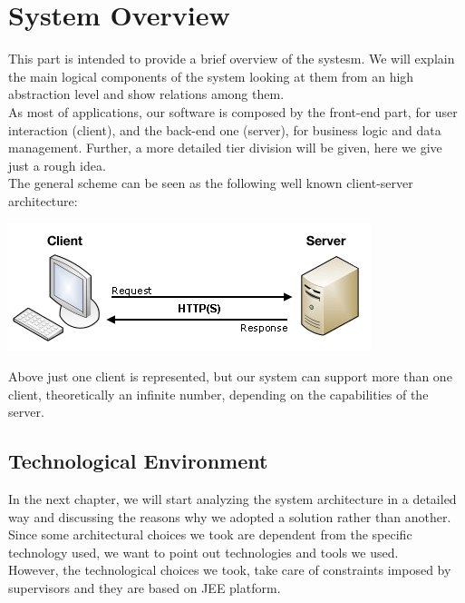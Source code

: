\documentclass[12pt]{book}
\begin{document}
\chapter{System Overview}
This part is intended to provide a brief overview of the systesm. We will explain the main logical components of the system looking at them from an high abstraction level and show relations among them. \\
As most of applications, our software is composed by the front-end part, for user interaction (client),  and the back-end one (server), for business logic and data management. 
Further, a more detailed tier division will be given, here we give just a rough idea. \\ The general scheme can be seen as the following well known client-server architecture: \\
\begin{center}
\includegraphics[scale=0.7]{client-server}
\end{center}
Above just one client is represented, but our system can support more than one client, theoretically an infinite number, depending on the capabilities of the server. 

\section{Technological Environment}
In the next chapter, we will start analyzing the system architecture in a detailed way and discussing the reasons why we adopted a solution rather than another. \\ 
Since some architectural choices we took are dependent from the specific technology used, we want to point out technologies and tools we used. \\
However, the technological choices we took, take care of constraints imposed by supervisors and they are based on JEE platform. \\
\end{document}
